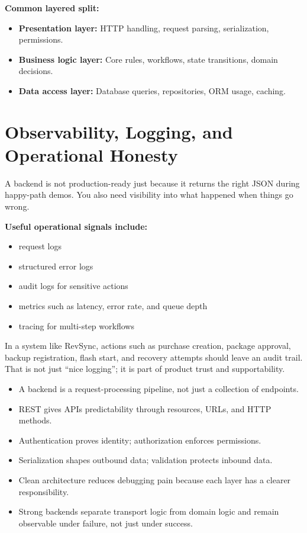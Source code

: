 \documentclass[12pt, a4paper, oneside]{book}
\begin{document}
\textbf{Common layered split:}
\begin{itemize}[leftmargin=2em]
    \item \textbf{Presentation layer:} HTTP handling, request parsing, serialization, permissions.
    \item \textbf{Business logic layer:} Core rules, workflows, state transitions, domain decisions.
    \item \textbf{Data access layer:} Database queries, repositories, ORM usage, caching.
\end{itemize}

\section{Observability, Logging, and Operational Honesty}

A backend is not production-ready just because it returns the right JSON during happy-path demos. You also need visibility into what happened when things go wrong.

\textbf{Useful operational signals include:}
\begin{itemize}[leftmargin=2em]
    \item request logs
    \item structured error logs
    \item audit logs for sensitive actions
    \item metrics such as latency, error rate, and queue depth
    \item tracing for multi-step workflows
\end{itemize}

\begin{projectbox}
In a system like RevSync, actions such as purchase creation, package approval, backup registration, flash start, and recovery attempts should leave an audit trail. That is not just ``nice logging''; it is part of product trust and supportability.
\end{projectbox}

\begin{summarybox}
\begin{itemize}[leftmargin=2em]
    \item A backend is a request-processing pipeline, not just a collection of endpoints.
    \item REST gives APIs predictability through resources, URLs, and HTTP methods.
    \item Authentication proves identity; authorization enforces permissions.
    \item Serialization shapes outbound data; validation protects inbound data.
    \item Clean architecture reduces debugging pain because each layer has a clearer responsibility.
    \item Strong backends separate transport logic from domain logic and remain observable under failure, not just under success.
\end{itemize}
\end{summarybox}
\end{document}
